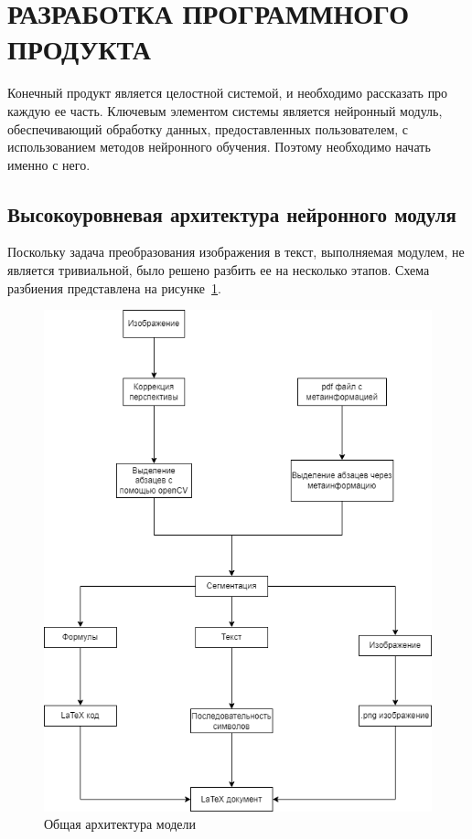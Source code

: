 \section{РАЗРАБОТКА ПРОГРАММНОГО ПРОДУКТА}

Конечный продукт является целостной системой, и необходимо рассказать про каждую ее часть. Ключевым элементом системы является нейронный модуль,
обеспечивающий обработку данных, предоставленных пользователем, с использованием методов нейронного обучения. Поэтому необходимо начать именно с него.
\subsection{Высокоуровневая архитектура нейронного модуля}

Поскольку задача преобразования изображения в текст, выполняемая модулем, не является тривиальной, было решено разбить ее на несколько этапов. 
Схема разбиения представлена на рисунке~\ref{neuro_model}.

\begin{figure}
\includegraphics[scale=0.55]{img/Blank_diagram.png}
\caption{Общая архитектура модели}
\label{neuro_model}
\end{figure}

